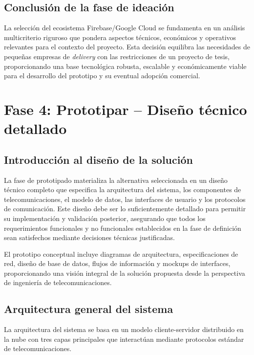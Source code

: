 \subsection{Conclusión de la fase de ideación}

La selección del ecosistema Firebase/Google Cloud se fundamenta en un análisis multicriterio riguroso que pondera aspectos técnicos, económicos y operativos relevantes para el contexto del proyecto. Esta decisión equilibra las necesidades de pequeñas empresas de \textit{delivery} con las restricciones de un proyecto de tesis, proporcionando una base tecnológica robusta, escalable y económicamente viable para el desarrollo del prototipo y su eventual adopción comercial.

\section{Fase 4: Prototipar – Diseño técnico detallado}

\subsection{Introducción al diseño de la solución}

La fase de prototipado materializa la alternativa seleccionada en un diseño técnico completo que especifica la arquitectura del sistema, los componentes de telecomunicaciones, el modelo de datos, las interfaces de usuario y los protocolos de comunicación. Este diseño debe ser lo suficientemente detallado para permitir su implementación y validación posterior, asegurando que todos los requerimientos funcionales y no funcionales establecidos en la fase de definición sean satisfechos mediante decisiones técnicas justificadas.

El prototipo conceptual incluye diagramas de arquitectura, especificaciones de red, diseño de base de datos, flujos de información y mockups de interfaces, proporcionando una visión integral de la solución propuesta desde la perspectiva de ingeniería de telecomunicaciones.

\subsection{Arquitectura general del sistema}

La arquitectura del sistema se basa en un modelo cliente-servidor distribuido en la nube con tres capas principales que interactúan mediante protocolos estándar de telecomunicaciones.

